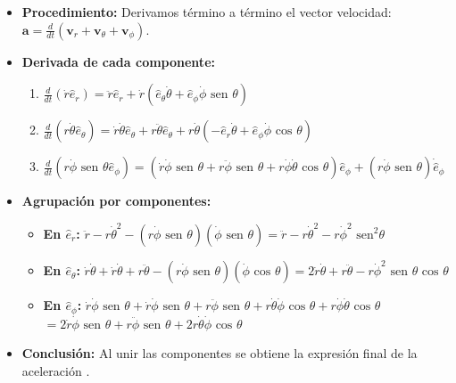 \documentclass[a4paper]{article}
\begin{document}
\begin{itemize}
    \item \textbf{Procedimiento:} Derivamos término a término el vector velocidad: $\mathbf{a} = \frac{d}{dt} (\mathbf{v}_r + \mathbf{v}_\theta + \mathbf{v}_\phi)$.
    \item \textbf{Derivada de cada componente:}
    \begin{enumerate}
        \item $\frac{d}{dt}(\dot{r}\hat{e}_r) = \ddot{r}\hat{e}_r + \dot{r}(\hat{e}_\theta \dot{\theta} + \hat{e}_\phi \dot{\phi} \text{ sen } \theta)$
        \item $\frac{d}{dt}(r\dot{\theta}\hat{e}_\theta) = \dot{r}\dot{\theta}\hat{e}_\theta + r\ddot{\theta}\hat{e}_\theta + r\dot{\theta}(-\hat{e}_r \dot{\theta} + \hat{e}_\phi \dot{\phi} \text{ cos } \theta)$
        \item $\frac{d}{dt}(r\dot{\phi} \text{ sen } \theta \hat{e}_\phi) = (\dot{r}\dot{\phi} \text{ sen } \theta + r\ddot{\phi} \text{ sen } \theta + r\dot{\phi}\dot{\theta} \text{ cos } \theta)\hat{e}_\phi + (r\dot{\phi} \text{ sen } \theta)\dot{\hat{e}}_\phi$
    \end{enumerate}
    \item \textbf{Agrupación por componentes:}
    \begin{itemize}
        \item \textbf{En $\hat{e}_r$:} $\ddot{r} - r\dot{\theta}^2 - (r\dot{\phi} \text{ sen } \theta)(\dot{\phi} \text{ sen } \theta) = \ddot{r} - r\dot{\theta}^2 - r\dot{\phi}^2 \text{ sen}^2 \theta$
        \item \textbf{En $\hat{e}_\theta$:} $\dot{r}\dot{\theta} + \dot{r}\dot{\theta} + r\ddot{\theta} - (r\dot{\phi} \text{ sen } \theta)(\dot{\phi} \text{ cos } \theta) = 2\dot{r}\dot{\theta} + r\ddot{\theta} - r\dot{\phi}^2 \text{ sen } \theta \text{ cos } \theta$
        \item \textbf{En $\hat{e}_\phi$:} $\dot{r}\dot{\phi} \text{ sen } \theta + \dot{r}\dot{\phi} \text{ sen } \theta + r\ddot{\phi} \text{ sen } \theta + r\dot{\theta}\dot{\phi} \text{ cos } \theta + r\dot{\phi}\dot{\theta} \text{ cos } \theta$ \\
        $= 2\dot{r}\dot{\phi} \text{ sen } \theta + r\ddot{\phi} \text{ sen } \theta + 2r\dot{\theta}\dot{\phi} \text{ cos } \theta$
    \end{itemize}
    \item \textbf{Conclusión:} Al unir las componentes se obtiene la expresión final de la aceleración \cite{72}.
\end{itemize}
\end{document}
